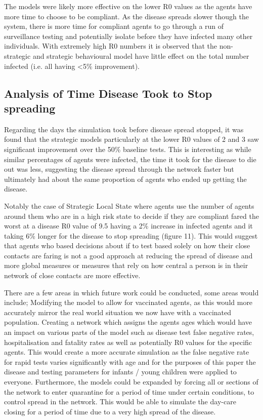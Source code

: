\documentclass{article}
\begin{document}
The models were likely more effective on the lower R0 values as the agents have more time to choose to be compliant. As the disease spreads slower though the system, there is more time for compliant agents to go through a run of surveillance testing and potentially isolate before they have infected many other individuals. With extremely high R0 numbers it is observed that the non-strategic and strategic behavioural model have little effect on the total number infected (i.e. all having <5\% improvement). 


\subsection{Analysis of Time Disease Took to Stop spreading}

Regarding the days the simulation took before disease spread stopped, it was found that the strategic models particularly at the lower R0 values of 2 and 3 saw significant improvement over the 50\% baseline tests. This is interesting as while similar percentages of agents were infected, the time it took for the disease to die out was less, suggesting the disease spread through the network faster but ultimately had about the same proportion of agents who ended up getting the disease.\newline 

Notably the case of Strategic Local State where agents use the number of agents around them who are in a high risk state to decide if they are compliant fared the worst at a disease R0 value of 9.5 having a 2\% increase in infected agents and it taking 6\% longer for the disease to stop spreading (figure 11). This would suggest that agents who based decisions about if to test based solely on how their close contacts are faring is not a good approach at reducing the spread of disease and more global measures or measures that rely on how central a person is in their network of close contacts are more effective. \newline 

There are a few areas in which future work could be conducted, some areas would include; Modifying the model to allow for vaccinated agents, as this would more accurately mirror the real world situation we now have with a vaccinated population. Creating a network which assigns the agents ages which would have an impact on various parts of the model such as disease test false negative rates, hospitalisation and fatality rates as well as potentially R0 values for the specific agents. This would create a more accurate simulation as the false negative rate for rapid tests varies significantly with age and for the purposes of this paper the disease and testing parameters for infants / young children were applied to everyone. Furthermore, the models could be expanded by forcing all or sections of the network to enter quarantine for a period of time under certain conditions, to control spread in the network. This would be able to simulate the day-care closing for a period of time due to a very high spread of the disease.
\end{document}
